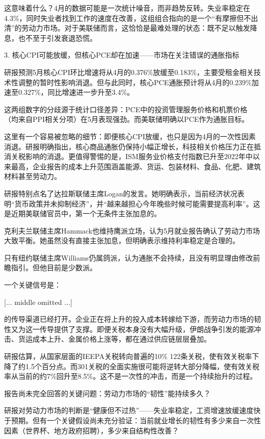 \documentclass[11pt]{ctexart}
\begin{document}
这意味着什么？4月的数据可能是一次统计噪音，而非趋势反转。失业率稳定在4.3\%，同时失业者找到工作的速度在改善，这组组合指向的是一个“有摩擦但不出清”的劳动力市场。对于美联储而言，这恰恰是最难处理的状态：既不足以触发降息，也不至于引发衰退恐慌。

3. 核心CPI可能放缓，但核心PCE却在加速——市场在关注错误的通胀指标

研报预测5月核心CPI环比增速将从4月的0.376\%放缓至0.183\%，主要受租金相关技术性调整的暂时性影响消退。但与此同时，核心PCE通胀预计将从4月的0.239\%加速至0.327\%，同比增速进一步升至3.4\%。

这两组数字的分歧源于统计口径差异：PCE中的投资管理服务价格和机票价格（均来自PPI相关分项）在5月表现强劲。而美联储明确以PCE作为通胀目标。

这里有一个容易被忽略的细节：即便核心CPI放缓，也只是因为4月的一次性因素消退。研报明确指出，核心商品通胀仍保持小幅正增长，科技相关价格压力正在抵消关税影响的消退。更值得警惕的是，ISM服务业价格支付指数已升至2022年中以来最高，企业报告的成本上升范围涵盖能源、货运、包装材料、食品、化肥、建筑材料甚至劳动力。

研报特别点名了达拉斯联储主席Logan的发言。她明确表示，当前经济状况表明“货币政策并未抑制经济”，并“越来越担心今年晚些时候可能需要提高利率”。这是近期美联储官员中，第一个无条件主张加息的。

克利夫兰联储主席Hammack也维持鹰派立场，认为5月就业报告确认了劳动力市场大致平衡。她虽然没有直接主张加息，但明确表示维持利率稳定是合理的。

只有纽约联储主席Williams仍属鸽派，认为通胀不会持续，且没有明显理由修改前瞻指引。但他目前是少数派。

一个关键信号是：

[... middle omitted ...]

的传导渠道已经打开。企业正在将上升的投入成本转嫁给下游，而劳动力市场的韧性又为这一传导提供了支撑。即便关税本身没有大幅升级，伊朗战争引发的能源冲击、货运成本上升、金属价格上涨等，都在通过供应链层层叠加。

研报估算，从国家层面的IEEPA关税转向普遍的10\% 122条关税，使有效关税率下降了约1.5个百分点。而301关税的全面实施很可能将逆转大部分降幅，使有效关税率从当前的约7\%回升至8.5\%。这不是一次性的冲击，而是一个持续抬升的过程。

报告尚未完全回答的关键问题：劳动力市场的“韧性”能持续多久？

研报对劳动力市场的判断是“健康但不过热”——失业率稳定，工资增速放缓速度快于预期。但有一个关键假设尚未充分验证：当前就业增长的韧性有多少来自一次性因素（世界杯、地方政府招聘），多少来自结构性改善？
\end{document}
